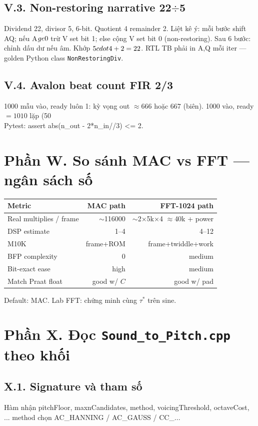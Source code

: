 \subsection*{V.3. Non-restoring narrative 22$\div$5}
Dividend 22, divisor 5, 6-bit. Quotient 4 remainder 2.
Liệt kê ý: mỗi bước shift AQ; nếu A$\\ge0$ trừ V set bit 1; else cộng V set bit 0 (non-restoring).
Sau 6 bước: chỉnh dấu dư nếu âm. Khớp $5\\cdot4+2=22$.
RTL TB phải in A,Q mỗi iter --- golden Python class \texttt{NonRestoringDiv}.
\subsection*{V.4. Avalon beat count FIR 2/3}
1000 mẫu vào, ready luôn 1: kỳ vọng out $\approx 666$ hoặc $667$ (biên).
1000 vào, ready $=1010$ lặp (50\\%
Pytest: assert abs(n\_out - 2*n\_in//3) <= 2.
\newpage\section*{Phần W. So sánh MAC vs FFT --- ngân sách số}
\begin{center}\small\begin{tabular}{@{}lrr@{}}
\toprule Metric & MAC path & FFT-1024 path \\ \midrule
Real multiplies / frame & $\sim$116000 & $\sim$2$\times$5k$\times$4 $\approx$40k + power \\
DSP estimate & 1--4 & 4--12 \\
M10K & frame+ROM & frame+twiddle+work \\
BFP complexity & 0 & medium \\
Bit-exact ease & high & medium \\
Match Praat float & good w/ $C$ & good w/ pad \\
\bottomrule\end{tabular}\end{center}
Default: MAC. Lab FFT: chứng minh cùng $\tau^*$ trên sine.
\newpage\section*{Phần X. Đọc \texttt{Sound\_to\_Pitch.cpp} theo khối}
\subsection*{X.1. Signature và tham số}
Hàm nhận pitchFloor, maxnCandidates, method, voicingThreshold, octaveCost, ...
method chọn AC\_HANNING / AC\_GAUSS / CC\_...
